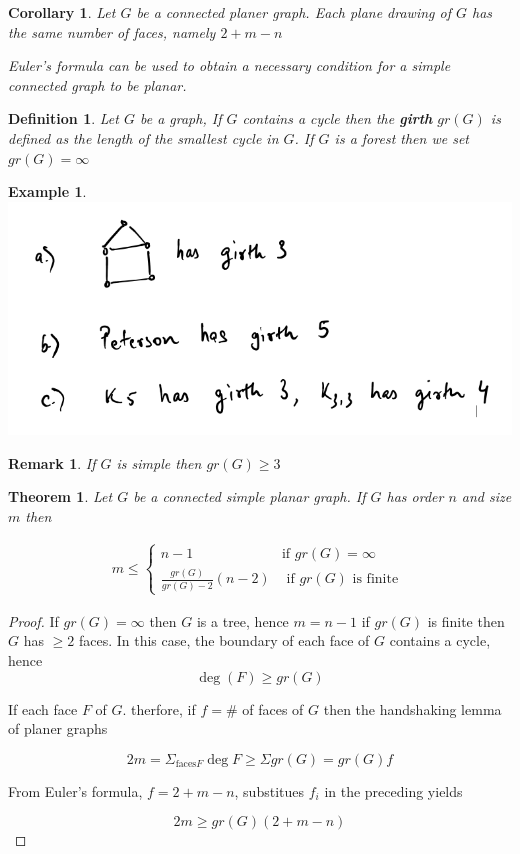 \documentclass[12pt]{article}
\newtheorem{theorem}{Theorem}
\newtheorem*{corollary}{Corollary}
\newtheorem{example}{Example}
\newtheorem{definition}{Definition}
\newtheorem*{remark}{Remark}
\newenvironment{pro}{\begin{proof}}{\end{proof}}
\begin{document}
\begin{corollary}

  Let $G$ be a connected planer graph. Each plane drawing of $G$ has the same number of faces, namely $2+m - n$

  Euler's formula can be used to obtain a necessary condition for a simple connected graph to be planar.
\end{corollary}

\begin{definition}
Let $G$ be a graph, If $G$ contains a cycle then the \textbf{girth} $gr(G)$ is defined as the length of the smallest cycle in $G$. If $G$ is a forest then we set $gr(G) = \infty$
\end{definition}

\begin{example}

  \includegraphics[scale=0.5]{example}

\end{example}


\begin{remark}
  If $G$ is simple then $gr(G) \ge 3$
\end{remark}


\begin{theorem}
  Let $G$ be a connected simple planar graph. If $G$ has order $n$ and size $m$ then

    \begin{align} m \le \begin{cases} n-1 & \text{if } gr(G) = \infty \\
                          \frac{gr(G)}{gr(G) - 2}(n-2) & \text{ if  } gr(G) \text{ is finite } \end{cases}
    \end{align}
\end{theorem}


\begin{pro}
  If $gr(G) = \infty$ then $G$ is a tree, hence $m = n-1$ if $gr(G)$ is finite then $G$ has $\ge 2$ faces. In this case, the boundary of each face of $G$ contains a cycle, hence
  \[\deg (F) \ge gr(G)\]

  If each face $F$ of $G$. therfore, if $f = \#$ of faces of $G$ then the handshaking lemma of planer graphs

  \[ 2m = \Sigma_{\text{faces} F} \deg F \ge \Sigma gr(G) = gr(G) f\]

  From Euler's formula, $f = 2+m-n$, substitues $f_{i}$ in the preceding yields

  \[2m \ge gr(G) (2+m-n)\]
\end{pro}
\end{document}

